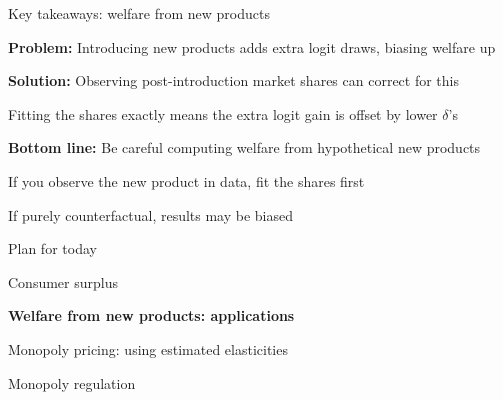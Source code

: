 \documentclass[notes,11pt, aspectratio=169]{beamer}
\newenvironment{wideitemize}{\itemize\addtolength{\itemsep}{10pt}}{\enditemize}
\newenvironment{wideenumerate}{\enumerate\addtolength{\itemsep}{10pt}}{\endenumerate}
\begin{document}
\begin{frame}{Key takeaways: welfare from new products}
	\begin{wideitemize}
		\item \textbf{Problem:} Introducing new products adds extra logit draws, biasing welfare up
		\item \textbf{Solution:} Observing post-introduction market shares can correct for this
		\begin{wideitemize}
			\vspace{5pt}
			\item Fitting the shares exactly means the extra logit gain is offset by lower $\delta$'s
		\end{wideitemize}
		\item \textbf{Bottom line:} Be careful computing welfare from hypothetical new products
		\begin{wideitemize}
			\vspace{5pt}
			\item If you observe the new product in data, fit the shares first
			\item If purely counterfactual, results may be biased
		\end{wideitemize}
	\end{wideitemize}
\end{frame}


\begin{frame}{Plan for today}
  \begin{wideenumerate}
    \item Consumer surplus
    \item \textbf{Welfare from new products: applications}
    \item Monopoly pricing: using estimated elasticities
    \item Monopoly regulation
  \end{wideenumerate}
\end{frame}
\end{document}
